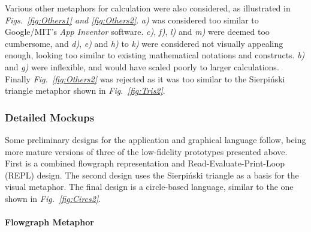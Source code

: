 \documentclass[12pt,twoside,notitlepage,xetex]{report}
\begin{document}
Various other metaphors for calculation were also considered, as illustrated in \emph{Figs.~\ref{fig:Others1} and \ref{fig:Others2}}.  \emph{a)} was considered too similar to Google/MIT's \emph{App Inventor} software.  \emph{c)}, \emph{f)}, \emph{l)} and \emph{m)} were deemed too cumbersome, and \emph{d)}, \emph{e)} and \emph{h)} to \emph{k)} were considered not visually appealing enough, looking too similar to existing mathematical notations and constructs.  \emph{b)} and \emph{g)} were inflexible, and would have scaled poorly to larger calculations.  Finally \emph{Fig.~\ref{fig:Others2}} was rejected as it was too similar to the Sierpiński triangle metaphor shown in \emph{Fig.~\ref{fig:Tris2}}.

\subsubsection{Detailed Mockups}

Some preliminary designs for the application and graphical language follow, being more mature versions of three of the low-fidelity prototypes presented above.  First is a combined flowgraph representation and Read-Evaluate-Print-Loop (REPL) design.  The second design uses the Sierpiński triangle as a basis for the visual metaphor.  The final design is a circle-based language, similar to the one shown in \emph{Fig.~\ref{fig:Circs2}}.

\paragraph{Flowgraph Metaphor}\hfill
\end{document}
